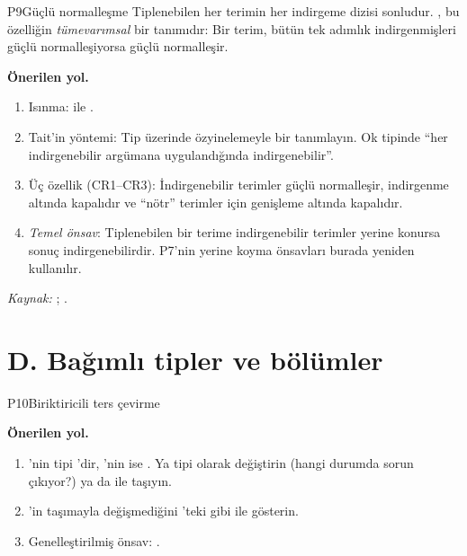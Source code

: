 \begin{projekarti}{P9}{Güçlü normalleşme}
Tiplenebilen her terimin her indirgeme dizisi sonludur. ,
bu özelliğin \emph{tümevarımsal} bir tanımıdır: Bir terim, bütün tek adımlık
indirgenmişleri güçlü normalleşiyorsa güçlü normalleşir.


\textbf{Önerilen yol.}
\begin{enumerate}[nosep]
  \item Isınma:  ile .
  \item Tait'in yöntemi: Tip üzerinde özyinelemeyle bir
         tanımlayın. Ok tipinde
        ``her indirgenebilir argümana uygulandığında indirgenebilir''.
  \item Üç özellik (CR1--CR3): İndirgenebilir terimler güçlü normalleşir,
        indirgenme altında kapalıdır ve ``nötr'' terimler için genişleme
        altında kapalıdır.
  \item \emph{Temel önsav}: Tiplenebilen bir terime indirgenebilir terimler
        yerine konursa sonuç indirgenebilirdir. P7'nin yerine koyma
        önsavları burada yeniden kullanılır.
\end{enumerate}
\emph{Kaynak:} \citet{tait1967}; \citet[Bölüm~6]{girard1989}.
\end{projekarti}

\section{D. Bağımlı tipler ve bölümler}\label{sec:projeler-d}

\begin{projekarti}{P10}{Biriktiricili ters çevirme}

\textbf{Önerilen yol.}
\begin{enumerate}[nosep]
  \item {}'nin tipi 'dir, 'nin
        ise . Ya tipi  olarak değiştirin
        (hangi durumda sorun çıkıyor?) ya da 
        ile taşıyın.
  \item {}'in taşımayla değişmediğini 'teki gibi
         ile gösterin.
  \item Genelleştirilmiş önsav: .
\end{enumerate}
\end{projekarti}

